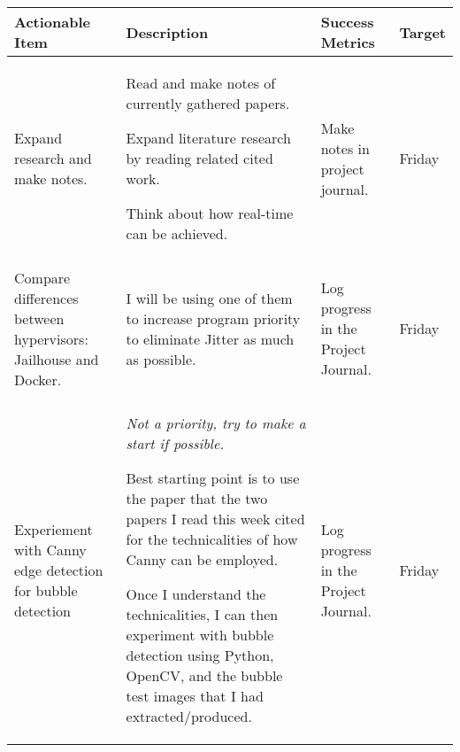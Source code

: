 \begin{table}[!h]
    \centering
    \begin{tabularx}{\textwidth}{|X|X|X|l|}
        \hline
        Actionable Item & Description & Success Metrics & Target \\
        \hline
        \hline
        Expand research and make notes. &
        \begin{myitemize}
            \item Read and make notes of currently gathered papers.
            \item Expand literature research by reading related cited work.
            \item Think about how real-time can be achieved.
        \end{myitemize} &
        \begin{myitemize}
            \item Make notes in project journal.
        \end{myitemize} &
        Friday \\
        \hline
        Compare differences between hypervisors: Jailhouse and Docker. &
        \begin{myitemize}
            \item I will be using one of them to increase program priority to eliminate Jitter as much as possible.
        \end{myitemize} &
        \begin{myitemize}
            \item Log progress in the Project Journal.
        \end{myitemize} &
        Friday \\
        \hline
        Experiement with Canny edge detection for bubble detection &
        \begin{myitemize}
            \item \textit{Not a priority, try to make a start if possible.}
            \item Best starting point is to use the paper that the two papers I read this week cited for the technicalities of how Canny can be employed.
            \item Once I understand the technicalities, I can then experiment with bubble detection using Python, OpenCV, and the bubble test images that I had extracted/produced.
        \end{myitemize} &
        \begin{myitemize}
            \item Log progress in the Project Journal.
        \end{myitemize} &
        Friday \\
        \hline
    \end{tabularx}
\end{table}
